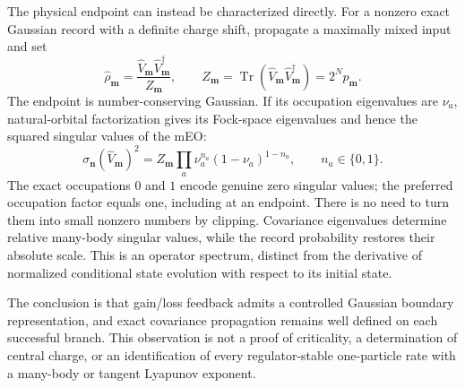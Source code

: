 \documentclass[aps,prb,onecolumn,nofootinbib,superscriptaddress]{revtex4-2}
\newcommand{\Tr}{\operatorname{Tr}}
\begin{document}
The physical endpoint can instead be characterized directly. For a
nonzero exact Gaussian record with a definite charge shift, propagate a
maximally mixed input and set
\begin{equation}
 \hat\rho_{\boldsymbol m}=\frac{\hat V_{\boldsymbol m}
 \hat V_{\boldsymbol m}^\dagger}{Z_{\boldsymbol m}},\qquad
 Z_{\boldsymbol m}=\Tr(\hat V_{\boldsymbol m}\hat V_{\boldsymbol m}^\dagger)
                 =2^N p_{\boldsymbol m}.
 \label{eq:maxmix}
\end{equation}
The endpoint is number-conserving Gaussian. If its occupation eigenvalues
are $\nu_a$, natural-orbital factorization gives its Fock-space eigenvalues
and hence the squared singular values of the mEO:
\begin{equation}
 \sigma_{\bm n}(\hat V_{\boldsymbol m})^2
 =Z_{\boldsymbol m}\prod_a\nu_a^{n_a}(1-\nu_a)^{1-n_a},
 \qquad n_a\in\{0,1\}.
 \label{eq:fock-spectrum}
\end{equation}
The exact occupations $0$ and $1$ encode genuine zero singular values;
the preferred occupation factor equals one, including at an endpoint.
There is no need to turn them into small nonzero numbers by clipping.
Covariance eigenvalues determine relative many-body singular values,
while the record probability restores their absolute scale. This is an
operator spectrum, distinct from the derivative of normalized conditional
state evolution with respect to its initial state.

The conclusion is that gain/loss feedback admits a controlled Gaussian boundary representation,
and exact covariance propagation remains well defined on each successful
branch. This observation is not a proof of criticality, a determination
of central charge, or an identification of every regulator-stable
one-particle rate with a many-body or tangent Lyapunov exponent.



\end{document}
